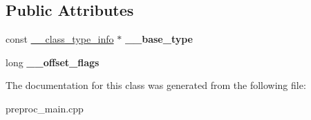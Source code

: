 \subsection*{Public Attributes}
\begin{DoxyCompactItemize}
\item 
\hypertarget{class____cxxabiv1_1_1____base__class__type__info_ab1fac8074f3bd2f70bcc437b06a16493}{const \hyperlink{class____cxxabiv1_1_1____class__type__info}{\+\_\+\+\_\+class\+\_\+type\+\_\+info} $\ast$ {\bfseries \+\_\+\+\_\+base\+\_\+type}}\label{class____cxxabiv1_1_1____base__class__type__info_ab1fac8074f3bd2f70bcc437b06a16493}

\item 
\hypertarget{class____cxxabiv1_1_1____base__class__type__info_a1c5371b6b4b2d15d8bc0ba2cb8071e14}{long {\bfseries \+\_\+\+\_\+offset\+\_\+flags}}\label{class____cxxabiv1_1_1____base__class__type__info_a1c5371b6b4b2d15d8bc0ba2cb8071e14}

\end{DoxyCompactItemize}


The documentation for this class was generated from the following file\+:\begin{DoxyCompactItemize}
\item 
preproc\+\_\+main.\+cpp\end{DoxyCompactItemize}
